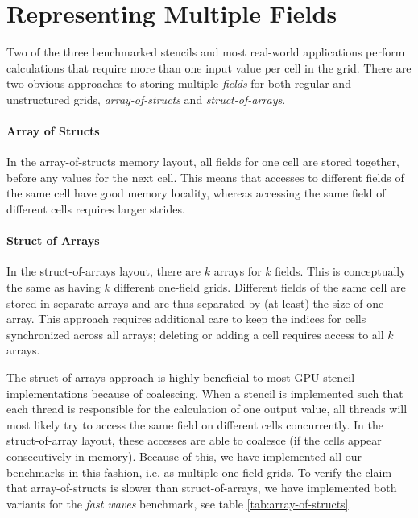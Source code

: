 \section{Representing Multiple Fields} \label{sec:representing-multiple-fields}

Two of the three benchmarked stencils and most real-world applications perform calculations that require more than one input value per cell in the grid. There are two obvious approaches to storing multiple \emph{fields} for both regular and unstructured grids, \emph{array-of-structs} and \emph{struct-of-arrays}.

\paragraph{Array of Structs}
In the array-of-structs memory layout, all fields for one cell are stored together, before any values for the next cell. This means that accesses to different fields of the same cell have good memory locality, whereas accessing the same field of different cells requires larger strides.

\paragraph{Struct of Arrays}
In the struct-of-arrays layout, there are $k$ arrays for $k$ fields. This is conceptually the same as having $k$ different one-field grids. Different fields of the same cell are stored in separate arrays and are thus separated by (at least) the size of one array. This approach requires additional care to keep the indices for cells synchronized across all arrays; deleting or adding a cell requires access to all $k$ arrays.

The struct-of-arrays approach is highly beneficial to most GPU stencil implementations because of coalescing. When a stencil is implemented such that each thread is responsible for the calculation of one output value, all threads will most likely try to access the same field on different cells concurrently. In the struct-of-array layout, these accesses are able to coalesce (if the cells appear consecutively in memory).  Because of this, we have implemented all our benchmarks in this fashion, i.e. as multiple one-field grids. To verify the claim that array-of-structs is slower than struct-of-arrays, we have implemented both variants for the \emph{fast waves} benchmark, see table \ref{tab:array-of-structs}.

